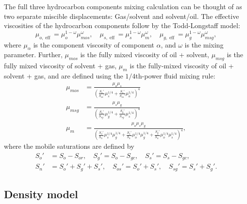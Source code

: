 \documentclass[11pt, a4paper]{article}
\DeclareMathOperator{\eff}{eff}
\begin{document}
The full three hydrocarbon components mixing calculation can be thought of as
two separate miscible displacements: Gas/solvent and solvent/oil. The effective
viscosities of the hydrocarbon components follow by the Todd-Longstaff model:
\begin{equation*}
  \mu_{o, \eff} = \mu_o^{1-\omega}\mu_{mos}^\omega, \quad
  \mu_{s, \eff} = \mu_s^{1-\omega}\mu_{m}^\omega, \quad
  \mu_{g, \eff} = \mu_g^{1-\omega}\mu_{msg}^\omega,
\end{equation*}
where $\mu_\alpha$ is the component viscosity of component $\alpha$, and $\omega$ is the mixing
parameter. Further, $\mu_{mos}$ is the fully mixed viscosity of oil + solvent, $\mu_{msg}$ is the
fully mixed viscosity of solvent + gas, $\mu_m$ is the fully-mixed viscosity of oil + solvent + gas,
and are defined using the $1/4$th-power fluid mixing rule:
\begin{align*}
  \mu_{mos} & = \frac{\mu_o \mu_s}{\left(\frac{S_o'}{S_{os}'}\mu_s^{1/4} + \frac{S_s'}{S_{os}'}\mu_o^{1/4}\right)^4} \\
  \mu_{msg} & = \frac{\mu_s \mu_g}{\left(\frac{S_s'}{S_{sg}'}\mu_g^{1/4} + \frac{S_g'}{S_{sg}'}\mu_s^{1/4}\right)^4} \\
  \mu_{m} & = \frac{\mu_o \mu_s \mu_g}{\left(\frac{S_o'}{S_{n}'}\mu_s^{1/4}\mu_g^{1/4}
            + \frac{S_s'}{S_{n}'}\mu_o^{1/4}\mu_g^{1/4}
            + \frac{S_g'}{S_{n}'}\mu_o^{1/4}\mu_s^{1/4}\right)^4},
\end{align*}
where the mobile saturations are defined by
\begin{align*}
  S_o' & = S_o - S_{or}, \quad S_g' = S_o - S_{gc}, \quad S_s' = S_s - S_{gc}, \\
  S_n' & = S_o' + S_g' + S_s', \quad S_{os}' = S_o' + S_s', \quad S_{sg}' = S_s' + S_g'.
\end{align*}

\subsection*{Density model}
\end{document}
